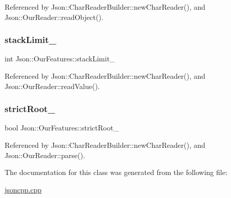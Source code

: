 Referenced by Json\+::\+Char\+Reader\+Builder\+::new\+Char\+Reader(), and Json\+::\+Our\+Reader\+::read\+Object().

\mbox{\label{classJson_1_1OurFeatures_a9a786713902d14be6d57a08cc03ccfff_a9a786713902d14be6d57a08cc03ccfff}} 
\subsubsection{\texorpdfstring{stack\+Limit\+\_\+}{stackLimit\_}}
{\footnotesize\ttfamily int Json\+::\+Our\+Features\+::stack\+Limit\+\_\+}



Referenced by Json\+::\+Char\+Reader\+Builder\+::new\+Char\+Reader(), and Json\+::\+Our\+Reader\+::read\+Value().

\mbox{\label{classJson_1_1OurFeatures_a2095f66a776c0a4ae6cc931a0c94242e_a2095f66a776c0a4ae6cc931a0c94242e}} 
\subsubsection{\texorpdfstring{strict\+Root\+\_\+}{strictRoot\_}}
{\footnotesize\ttfamily bool Json\+::\+Our\+Features\+::strict\+Root\+\_\+}



Referenced by Json\+::\+Char\+Reader\+Builder\+::new\+Char\+Reader(), and Json\+::\+Our\+Reader\+::parse().



The documentation for this class was generated from the following file\+:\begin{DoxyCompactItemize}
\item 
\hyperlink{jsoncpp_8cpp}{jsoncpp.\+cpp}\end{DoxyCompactItemize}
